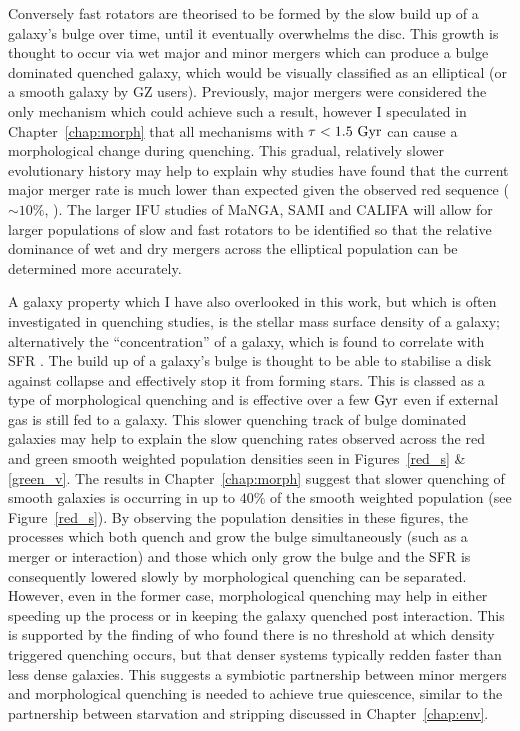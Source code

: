 Conversely fast rotators are theorised to be formed by the slow build up of a galaxy's bulge over time, until it eventually overwhelms the disc. This growth is thought to occur via wet major and minor mergers \citep{duc11} which can produce a bulge dominated quenched galaxy, which would be visually classified as an elliptical (or a smooth galaxy by GZ users). Previously, major mergers were considered the only mechanism which could achieve such a result, however I speculated in Chapter~\ref{chap:morph} that all mechanisms with $\tau < 1.5 ~\rm{Gyr}$ can cause a morphological change during quenching. This gradual, relatively slower evolutionary history may help to explain why studies have found that the current major merger rate is much lower than expected given the observed red sequence ($\sim 10\%$, \citealt{Lotz11}). The larger IFU studies of MaNGA, SAMI and CALIFA will allow for larger populations of slow and fast rotators to be identified so that the relative dominance of wet and dry mergers across the elliptical population can be determined more accurately. 

A galaxy property which I have also overlooked in this work, but which is often investigated in quenching studies, is the stellar mass surface density of a galaxy; alternatively the ``concentration'' of a galaxy, which is found to correlate with SFR \citep{barro13b, whitaker16}. The build up of a galaxy's bulge is thought to be able to stabilise a disk against collapse and effectively stop it from forming stars. This is classed as a type of morphological quenching and is effective over a few $\rm{Gyr}$ \citep{Fang13} even if external gas is still fed to a galaxy. This slower quenching track of bulge dominated galaxies may help to explain the slow quenching rates observed across the red and green smooth weighted population densities seen in Figures~\ref{red_s} \& \ref{green_v}. The results in Chapter~\ref{chap:morph} suggest that slower quenching of smooth galaxies is occurring in up to $40\%$ of the smooth weighted population (see Figure~\ref{red_s}). By observing the population densities in these figures, the processes which both quench and grow the bulge simultaneously (such as a merger or interaction) and those which only grow the bulge and the SFR is consequently lowered slowly by morphological quenching can be separated. However, even in the former case, morphological quenching may help in either speeding up the process or in keeping the galaxy quenched post interaction. This is supported by the finding of \cite{abramson16} who found there is no threshold at which density triggered quenching occurs, but that denser systems typically redden faster than less dense galaxies. This suggests a symbiotic partnership between minor mergers and morphological quenching is needed to achieve true quiescence, similar to the partnership between starvation and stripping discussed in Chapter~\ref{chap:env}. 

